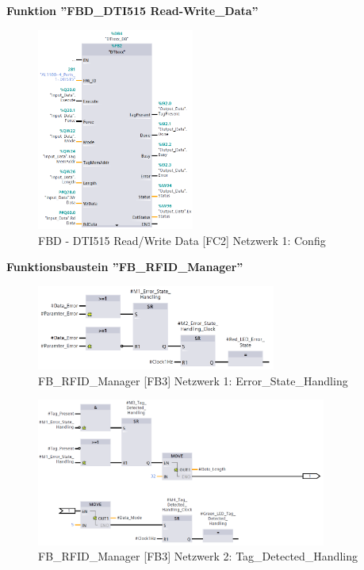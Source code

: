 \textbf{\LARGE Funktion ''FBD\_DTI515 Read-Write\_Data''}
\begin{figure}[h!]
	\centering
	\includegraphics[width=0.46\textwidth]{images/DTI515ReadWriteDataNetzwerk1.png}
	\caption{FBD - DTI515 Read/Write Data [FC2] Netzwerk 1: Config}
	\label{fig:DTI515ReadWriteData[FC2]Netzwerk1}
\end{figure}
\newpage
\textbf{\LARGE Funktionsbaustein ''FB\_RFID\_Manager''}
\begin{figure}[h!]
	\centering
	\includegraphics[width=0.7\textwidth]{images/FBRFIDManagerNetzwerk1.png}
	\caption{FB\_RFID\_Manager [FB3] Netzwerk 1: Error\_State\_Handling}
	\label{fig:FBRFIDManager[FB3]Netzwerk1}
\end{figure}
\begin{figure}[h!]
	\centering
	\includegraphics[width=0.85\textwidth]{images/FBRFIDManagerNetzwerk2.png}
	\caption{FB\_RFID\_Manager [FB3] Netzwerk 2: Tag\_Detected\_Handling}
	\label{fig:FBRFIDManager[FB3]Netzwerk2}
\end{figure}
